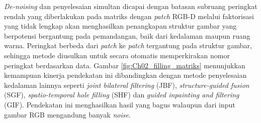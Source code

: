 \textit{De-noising} dan penyelesaian simultan dicapai dengan batasan subruang peringkat rendah yang diberlakukan pada matriks dengan \textit{patch} RGB-D melalui faktorisasi yang tidak lengkap akan
menghasilkan penangkapan struktur gambar yang berpotensi bergantung pada pemandangan, baik dari kedalaman maupun ruang warna. Peringkat berbeda dari \textit{patch} ke \textit{patch} tergantung pada struktur gambar, sehingga metode diusulkan untuk secara otomatis memperkirakan nomor peringkat berdasarkan data. Gambar \ref*{fig:Ch02_filling_matriks} menunjukkan kemampuan kinerja pendekatan ini dibandingkan dengan metode penyelesaian kedalaman lainnya seperti \textit{joint bilateral filtering} (JBF), \textit{structure-guided fusion} (SGF), \textit{spatio-temporal hole filling} (SHF) dan \textit{guided inpainting and filtering} (GIF). Pendekatan ini menghasilkan hasil yang bagus walaupun dari input gambar RGB mengandung banyak \textit{noise}.

 
